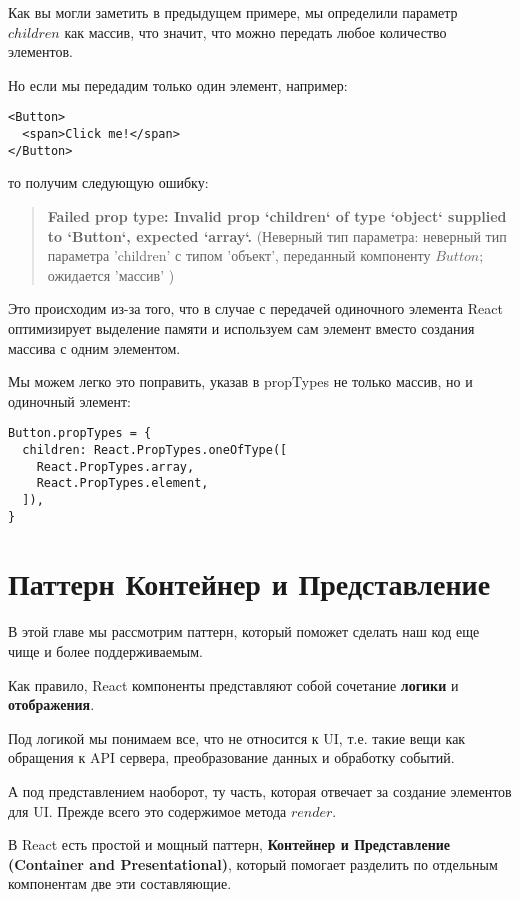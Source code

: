Как вы могли заметить в предыдущем примере, мы определили параметр $children$ как массив, что значит, что можно передать любое количество элементов.

Но если мы передадим только один элемент, например:

\begin{lstlisting}
<Button>
  <span>Click me!</span>
</Button>
\end{lstlisting}

то получим следующую ошибку:

\begin{quote}
	\textbf{ Failed prop type: Invalid prop `children` of type `object` supplied to `Button`, expected `array`.} (Неверный тип параметра: неверный тип параметра 'children' с типом 'объект', переданный компоненту $Button$; ожидается 'массив' )
\end{quote}

Это происходим из-за того, что в случае с передачей одиночного элемента React оптимизирует выделение памяти и используем сам элемент вместо создания массива с одним элементом.

Мы можем легко это поправить, указав в propTypes не только массив, но и одиночный элемент:

\begin{lstlisting}
Button.propTypes = {
  children: React.PropTypes.oneOfType([
    React.PropTypes.array,
    React.PropTypes.element,
  ]),
}
\end{lstlisting}

\section{Паттерн Контейнер и Представление}

В этой главе мы рассмотрим паттерн, который поможет сделать наш код еще чище и более поддерживаемым.

Как правило, React компоненты представляют собой сочетание \textbf{логики} и \textbf{отображения}.

Под логикой мы понимаем все, что не относится к UI, т.е. такие вещи как обращения к API сервера, преобразование данных и обработку событий.

А под представлением наоборот, ту часть, которая отвечает за создание элементов для UI. Прежде всего это содержимое метода $render$.

В React есть простой и мощный паттерн, \textbf{Контейнер и Представление (Container and Presentational)}, который помогает разделить по отдельным компонентам две эти составляющие.

